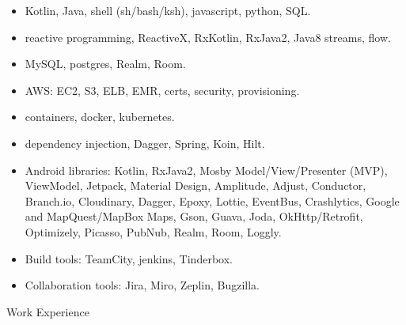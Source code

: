 \begin{itemize}
\item Kotlin, Java, shell (sh/bash/ksh), javascript, python, SQL. \\[-18pt]
\item  reactive programming, ReactiveX, RxKotlin, RxJava2, Java8 streams, flow. \\[-18pt]
\item  MySQL, postgres, Realm, Room.  \\[-18pt]
\item  AWS: EC2, S3, ELB, EMR, certs, security, provisioning.  \\[-18pt]
\item  containers, docker, kubernetes.  \\[-18pt]
\item  dependency injection, Dagger, Spring, Koin, Hilt.   \\[-18pt]
\item Android libraries:
	Kotlin, RxJava2, Mosby Model/View/Presenter (MVP), ViewModel, Jetpack, Material Design,
	   Amplitude, Adjust, Conductor, Branch.io, Cloudinary, Dagger, Epoxy, Lottie, EventBus, Crashlytics,
	   Google and MapQuest/MapBox Maps, Gson, Guava, Joda, OkHttp/Retrofit, Optimizely, Picasso, PubNub,
	   Realm, Room, Loggly. \\[-18pt]
\item Build tools: TeamCity, jenkins, Tinderbox.   \\[-18pt]
\item Collaboration tools: Jira, Miro, Zeplin, Bugzilla.   \\
\end{itemize}


\begin{bf} \large
Work Experience
\end{bf}
\medskip

